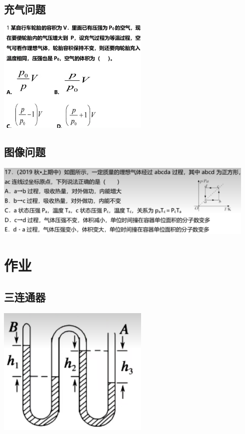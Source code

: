 \documentclass{article}
\begin{document}
\vspace{2em}

\subsection{充气问题}
\includegraphics[width=0.55\textwidth,keepaspectratio]{./pictures/2.3-10.png}

\vspace{2em}

\subsection{图像问题}
\includegraphics[width=0.95\textwidth,keepaspectratio]{./pictures/2.3-33.png}

\newpage

\section{作业}

\subsection{三连通器}
\includegraphics[width=0.55\textwidth,keepaspectratio]{./pictures/2.3-1.png}
\end{document}

